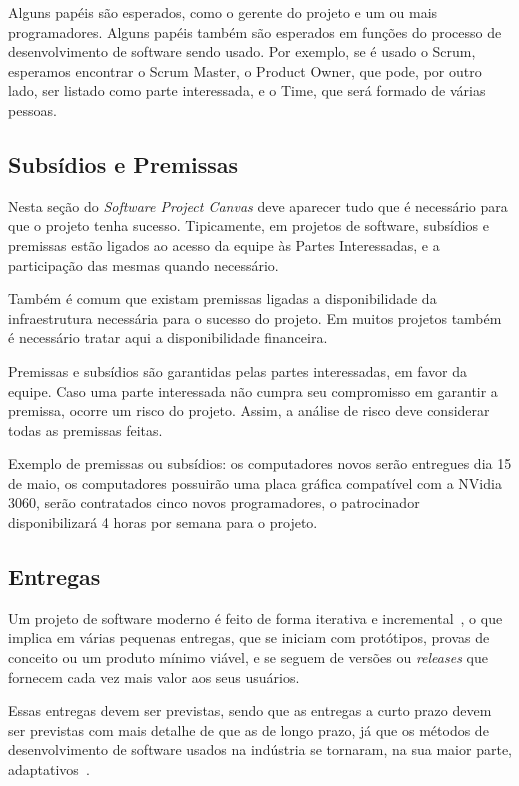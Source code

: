 \documentclass[a4]{report}
\begin{document}
Alguns papéis são esperados\citeauthor{finocchio:2013}, como o gerente do projeto e um ou mais programadores. Alguns papéis também são esperados em funções do processo de desenvolvimento de software sendo usado. Por exemplo, se é usado o Scrum, esperamos encontrar o Scrum Master, o Product Owner, que pode, por outro lado, ser listado como parte interessada, e o Time, que será formado de várias pessoas.

\subsection{Subsídios e Premissas}

Nesta seção do \textit{Software Project Canvas} deve aparecer tudo que é necessário para que o projeto tenha sucesso. Tipicamente, em projetos de software, subsídios e premissas estão ligados ao acesso da equipe às Partes Interessadas, e a participação das mesmas quando necessário. 

Também é comum que existam premissas ligadas a disponibilidade da infraestrutura necessária para o sucesso do projeto. Em muitos projetos também é necessário tratar aqui a disponibilidade financeira.

Premissas e subsídios são garantidas pelas partes interessadas, em favor da equipe. Caso uma parte interessada não cumpra seu compromisso em garantir a premissa, ocorre um risco do projeto. Assim, a análise de risco deve considerar todas as premissas feitas.

Exemplo de premissas ou subsídios: os computadores novos serão entregues dia 15 de maio, os computadores possuirão uma placa gráfica compatível com a NVidia 3060, serão contratados cinco novos programadores, o patrocinador disponibilizará 4 horas por semana para o projeto.

\subsection{Entregas}

Um projeto de software moderno é feito de forma iterativa e incremental~\citep{pressman:2019,essential:scrum}, o que implica em várias pequenas entregas, que se iniciam com protótipos, provas de conceito ou um produto mínimo viável, e se seguem de versões ou \textit{releases} que fornecem cada vez mais valor aos seus usuários.

Essas entregas devem ser previstas, sendo que as entregas a curto prazo devem ser previstas com mais detalhe de que as de longo prazo, já que os métodos de desenvolvimento de software usados na indústria se tornaram, na sua maior parte, adaptativos~\citep{agilestate15}.
\end{document}
